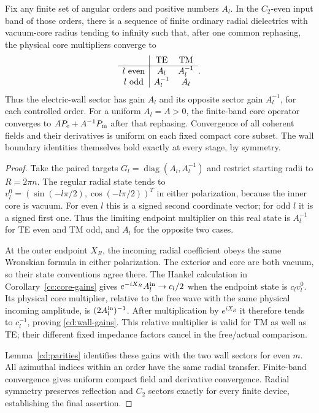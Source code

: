 \begin{theorem}
\label{cd:wall-isolation}
Fix any finite set of angular orders and positive numbers $A_l$.
In the $C_2$-even input band of those orders, there is a sequence
of finite ordinary radial dielectrics with vacuum-core radius
tending to infinity such that, after one common rephasing, the
physical core multipliers converge to
\begin{equation}\label{cd:wall-gains}
 \begin{array}{c|cc}
 &{\rm TE}&{\rm TM}\\ \hline
 l\ {\rm even}&A_l&A_l^{-1}\\
 l\ {\rm odd}&A_l^{-1}&A_l
 \end{array}.
\end{equation}
Thus the electric-wall sector has gain $A_l$ and its opposite
sector gain $A_l^{-1}$, for each controlled order. For a uniform
$A_l=A>0$, the finite-band core operator converges to
$A P_{\rm e}+A^{-1}P_{\rm m}$ after that rephasing.
Convergence of all coherent fields and their derivatives is
uniform on each fixed compact core subset. The wall boundary
identities themselves hold exactly at every stage, by symmetry.
\end{theorem}
\begin{proof}
Take the paired targets
$G_l=\operatorname{diag}(A_l,A_l^{-1})$ and restrict starting
radii to $R=2\pi n$. The regular radial state tends to
$v_l^0=(\sin(-l\pi/2),\cos(-l\pi/2))^T$ in either polarization,
because the inner core is vacuum. For even $l$ this is a signed
second coordinate vector; for odd $l$ it is a signed first one.
Thus the limiting endpoint multiplier on this real state is
$A_l^{-1}$ for TE even and TM odd, and $A_l$ for the opposite
two cases.

At the outer endpoint $X_R$, the incoming radial coefficient
obeys the same Wronskian formula in either polarization. The
exterior and core are both vacuum, so their state conventions
agree there. The Hankel calculation in
Corollary~\ref{cc:core-gains} gives
$e^{-iX_R}A_l^{\rm in}\to c_l/2$ when the endpoint state is
$c_l v_l^0$. Its physical core multiplier, relative to the free
wave with the same physical incoming amplitude, is
$(2A_l^{\rm in})^{-1}$. After multiplication by $e^{iX_R}$ it
therefore tends to $c_l^{-1}$, proving \eqref{cd:wall-gains}.
This relative multiplier is valid for TM as well as TE; their
different fixed impedance factors cancel in the free/actual
comparison.

Lemma~\ref{cd:parities} identifies these gains with the two wall
sectors for even $m$. All azimuthal indices within an order have
the same radial transfer. Finite-band convergence gives uniform
compact field and derivative convergence. Radial symmetry
preserves reflection and $C_2$ sectors exactly for every finite
device, establishing the final assertion.
\end{proof}

